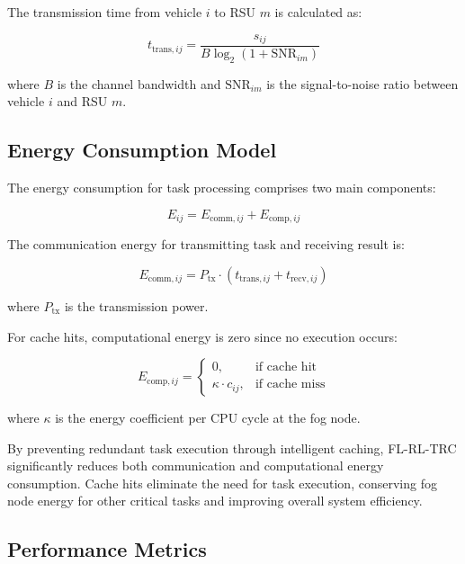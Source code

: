 The transmission time from vehicle $i$ to RSU $m$ is calculated as:

\begin{equation}
    t_{\text{trans},ij} = \frac{s_{ij}}{B \log_2(1 + \text{SNR}_{im})}
\end{equation}

where $B$ is the channel bandwidth and $\text{SNR}_{im}$ is the signal-to-noise ratio between vehicle $i$ and RSU $m$.

\subsection{Energy Consumption Model}

The energy consumption for task processing comprises two main components:

\begin{equation}
    E_{ij} = E_{\text{comm},ij} + E_{\text{comp},ij}
\end{equation}

The communication energy for transmitting task and receiving result is:

\begin{equation}
    E_{\text{comm},ij} = P_{\text{tx}} \cdot (t_{\text{trans},ij} + t_{\text{recv},ij})
\end{equation}

where $P_{\text{tx}}$ is the transmission power.

For cache hits, computational energy is zero since no execution occurs:

\begin{equation}
    E_{\text{comp},ij} = 
    \begin{cases}
        0, & \text{if cache hit} \\
        \kappa \cdot c_{ij}, & \text{if cache miss}
    \end{cases}
\end{equation}

where $\kappa$ is the energy coefficient per CPU cycle at the fog node.

By preventing redundant task execution through intelligent caching, FL-RL-TRC significantly reduces both communication and computational energy consumption. Cache hits eliminate the need for task execution, conserving fog node energy for other critical tasks and improving overall system efficiency.

\subsection{Performance Metrics}

